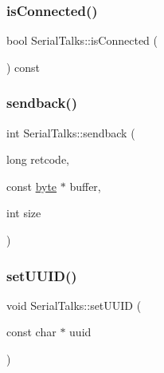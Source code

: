 \subsubsection{\texorpdfstring{is\+Connected()}{isConnected()}}
{\footnotesize\ttfamily bool Serial\+Talks\+::is\+Connected (\begin{DoxyParamCaption}{ }\end{DoxyParamCaption}) const\hspace{0.3cm}{\ttfamily [inline]}}

\mbox{\label{class_serial_talks_a19f503e1040f6e8f157b4ff579343f62}} 
\subsubsection{\texorpdfstring{sendback()}{sendback()}}
{\footnotesize\ttfamily int Serial\+Talks\+::sendback (\begin{DoxyParamCaption}\item[{long}]{retcode,  }\item[{const \hyperlink{serialutils_8h_a0c8186d9b9b7880309c27230bbb5e69d}{byte} $\ast$}]{buffer,  }\item[{int}]{size }\end{DoxyParamCaption})\hspace{0.3cm}{\ttfamily [protected]}}

\mbox{\label{class_serial_talks_a66e896e6d974c4e4eb9ed890b15c38c1}} 
\subsubsection{\texorpdfstring{set\+U\+U\+I\+D()}{setUUID()}}
{\footnotesize\ttfamily void Serial\+Talks\+::set\+U\+U\+ID (\begin{DoxyParamCaption}\item[{const char $\ast$}]{uuid }\end{DoxyParamCaption})}

\mbox{\label{class_serial_talks_a1cf3e5668f7a1d1cd1296535ef011528}} 
